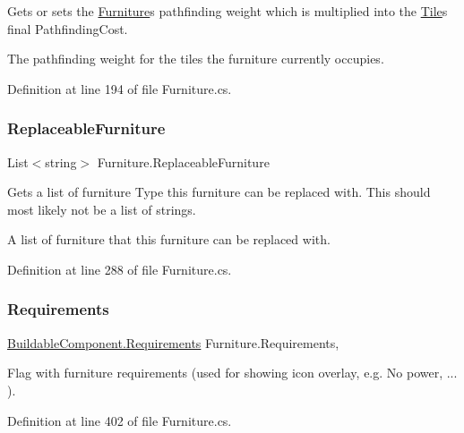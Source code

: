 Gets or sets the \hyperlink{class_furniture}{Furniture}\textquotesingle{}s pathfinding weight which is multiplied into the \hyperlink{class_tile}{Tile}\textquotesingle{}s final Pathfinding\+Cost. 

The pathfinding weight for the tiles the furniture currently occupies.

Definition at line 194 of file Furniture.\+cs.

\mbox{\label{class_furniture_a02d901fd13537cfeaafbae655c42391d}} 
\subsubsection{\texorpdfstring{Replaceable\+Furniture}{ReplaceableFurniture}}
{\footnotesize\ttfamily List$<$string$>$ Furniture.\+Replaceable\+Furniture\hspace{0.3cm}{\ttfamily [get]}}



Gets a list of furniture Type this furniture can be replaced with. This should most likely not be a list of strings. 

A list of furniture that this furniture can be replaced with.

Definition at line 288 of file Furniture.\+cs.

\mbox{\label{class_furniture_a9c624d4c2cc252ae4cec2dc36d585953}} 
\subsubsection{\texorpdfstring{Requirements}{Requirements}}
{\footnotesize\ttfamily \hyperlink{class_project_porcupine_1_1_buildable_1_1_components_1_1_buildable_component_a331a0d67512b8b402c04c8cf31c0ca8a}{Buildable\+Component.\+Requirements} Furniture.\+Requirements\hspace{0.3cm}{\ttfamily [get]}, {}}



Flag with furniture requirements (used for showing icon overlay, e.\+g. No power, ... ). 



Definition at line 402 of file Furniture.\+cs.

